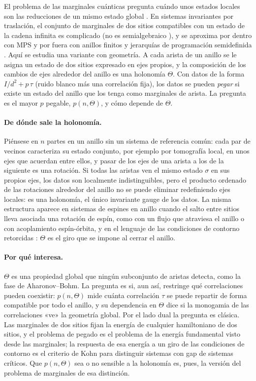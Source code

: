 \documentclass[11pt,a4paper]{article}
\theoremstyle{remark}
\begin{document}
El problema de las marginales cuánticas pregunta cuándo unos estados locales son las reducciones de
un mismo estado global \cite{klyachko}. En sistemas invariantes por traslación, el conjunto de
marginales de dos sitios compatibles con un estado de la cadena infinita es complicado (no es
semialgebraico \cite{blakaj-wolf}), y se aproxima por dentro con MPS y por fuera con anillos finitos
y jerarquías de programación semidefinida \cite{blakaj-wolf,navascues-baccari-acin,kim-marginal}.
Aquí se estudia una variante con geometría. A cada arista de
un anillo se le asigna un estado de dos sitios expresado en ejes propios, y la composición de los
cambios de ejes alrededor del anillo es una holonomía $\Theta$. Con datos de la forma
$I/d^2+p\,\tau$ (ruido blanco más una correlación fija), los datos se pueden \emph{pegar} si existe
un estado del anillo que los tenga como marginales de arista. La pregunta es el mayor $p$ pegable,
$p(n,\Theta)$, y cómo depende de $\Theta$.

\paragraph{De dónde sale la holonomía.} Piénsese en $n$ partes en un anillo sin un sistema de
referencia común: cada par de vecinos caracteriza su estado conjunto, por ejemplo por tomografía
local, en unos ejes que acuerdan entre ellos, y pasar de los ejes de una arista a los de la
siguiente es una rotación. Si todas las aristas ven el mismo estado $\sigma$ en sus propios ejes, los
datos son localmente indistinguibles, pero el producto ordenado de las rotaciones alrededor del
anillo no se puede eliminar redefiniendo ejes locales: es una holonomía, el único invariante gauge
de los datos. La misma estructura aparece en sistemas de espines en anillo cuando el salto entre
sitios lleva asociada una rotación de espín, como con un flujo que atraviesa el anillo o con
acoplamiento espín-órbita, y en el lenguaje de las condiciones de contorno retorcidas
\cite{shastry}: $\Theta$ es el giro que se impone al cerrar el anillo.

\paragraph{Por qué interesa.} $\Theta$ es una propiedad global que ningún subconjunto de aristas
detecta, como la fase de Aharonov--Bohm. La pregunta es si, aun así, restringe qué correlaciones
pueden coexistir: $p(n,\Theta)$ mide cuánta correlación $\tau$ se puede repartir de forma compatible
por todo el anillo, y su dependencia en $\Theta$ dice si la monogamia de las correlaciones «ve» la
geometría global. Por el lado dual la pregunta es clásica. Las marginales de dos sitios fijan la
energía de cualquier hamiltoniano de dos sitios, y el problema de pegado es el problema de la
energía fundamental visto desde las marginales; la respuesta de esa energía a un giro de las
condiciones de contorno es el criterio de Kohn \cite{kohn} para distinguir sistemas con gap de
sistemas críticos. Que $p(n,\Theta)$ sea o no sensible a la holonomía es, pues, la versión del
problema de marginales de esa distinción.
\end{document}
